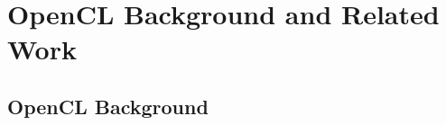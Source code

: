 
\chapter{OpenCL Background and Related Work} %

\label{Chapter2} %



\section{OpenCL Background}

